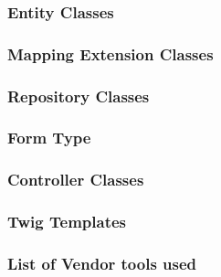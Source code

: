 \documentclass[a4paper,12pt]{article}
\begin{document}
\subsubsection {Entity Classes}
\subsubsection {Mapping Extension Classes}
\subsubsection {Repository Classes}
\subsubsection {Form Type}
\subsubsection {Controller Classes}
\subsubsection {Twig Templates}
\subsubsection {List of Vendor tools used}
\newpage\printbibliography[title={Bibliography}]
\end{document}
